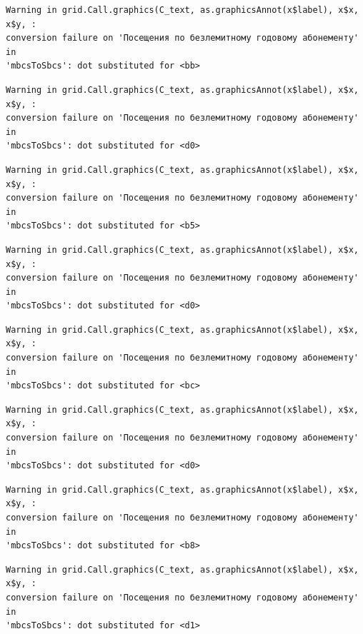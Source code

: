 \documentclass[
  letterpaper,
  DIV=11,
  numbers=noendperiod]{scrartcl}
\begin{document}
\begin{verbatim}
Warning in grid.Call.graphics(C_text, as.graphicsAnnot(x$label), x$x, x$y, :
conversion failure on 'Посещения по безлемитному годовому абонементу' in
'mbcsToSbcs': dot substituted for <bb>
\end{verbatim}

\begin{verbatim}
Warning in grid.Call.graphics(C_text, as.graphicsAnnot(x$label), x$x, x$y, :
conversion failure on 'Посещения по безлемитному годовому абонементу' in
'mbcsToSbcs': dot substituted for <d0>
\end{verbatim}

\begin{verbatim}
Warning in grid.Call.graphics(C_text, as.graphicsAnnot(x$label), x$x, x$y, :
conversion failure on 'Посещения по безлемитному годовому абонементу' in
'mbcsToSbcs': dot substituted for <b5>
\end{verbatim}

\begin{verbatim}
Warning in grid.Call.graphics(C_text, as.graphicsAnnot(x$label), x$x, x$y, :
conversion failure on 'Посещения по безлемитному годовому абонементу' in
'mbcsToSbcs': dot substituted for <d0>
\end{verbatim}

\begin{verbatim}
Warning in grid.Call.graphics(C_text, as.graphicsAnnot(x$label), x$x, x$y, :
conversion failure on 'Посещения по безлемитному годовому абонементу' in
'mbcsToSbcs': dot substituted for <bc>
\end{verbatim}

\begin{verbatim}
Warning in grid.Call.graphics(C_text, as.graphicsAnnot(x$label), x$x, x$y, :
conversion failure on 'Посещения по безлемитному годовому абонементу' in
'mbcsToSbcs': dot substituted for <d0>
\end{verbatim}

\begin{verbatim}
Warning in grid.Call.graphics(C_text, as.graphicsAnnot(x$label), x$x, x$y, :
conversion failure on 'Посещения по безлемитному годовому абонементу' in
'mbcsToSbcs': dot substituted for <b8>
\end{verbatim}

\begin{verbatim}
Warning in grid.Call.graphics(C_text, as.graphicsAnnot(x$label), x$x, x$y, :
conversion failure on 'Посещения по безлемитному годовому абонементу' in
'mbcsToSbcs': dot substituted for <d1>
\end{verbatim}
\end{document}
